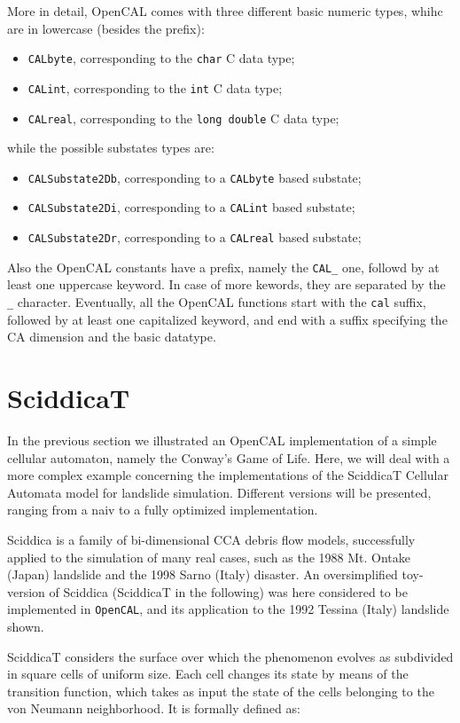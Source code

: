 More in detail, OpenCAL comes with three different basic numeric
types, whihc are in lowercase (besides the prefix):
\begin{itemize}
\item \verb'CALbyte', corresponding to the \verb'char' C data type;
\item \verb'CALint', corresponding to the \verb'int' C data type;
\item \verb'CALreal', corresponding to the \verb'long double' C data type;
\end{itemize}
while the possible substates types are:
\begin{itemize}
\item \verb'CALSubstate2Db', corresponding to a \verb'CALbyte' based substate;
\item \verb'CALSubstate2Di', corresponding to a \verb'CALint' based substate;
\item \verb'CALSubstate2Dr', corresponding to a \verb'CALreal' based substate;
\end{itemize}
Also the OpenCAL constants have a prefix, namely the \verb'CAL_' one,
followd by at least one uppercase keyword. In case of more kewords, they
are separated by the \verb'_' character. Eventually, all the OpenCAL
functions start with the \verb'cal' suffix, followed by at least one
capitalized keyword, and end with a suffix specifying the CA dimension
and the basic datatype.


\section{SciddicaT}
In the previous section we illustrated an OpenCAL implementation of a
simple cellular automaton, namely the Conway’s Game of Life. Here, we
will deal with a more complex example concerning the implementations
of the SciddicaT Cellular Automata model for landslide
simulation. Different versions will be presented, ranging from a naiv
to a fully optimized implementation.

Sciddica is a family of bi-dimensional CCA debris flow models,
successfully applied to the simulation of many real cases, such as the
1988 Mt. Ontake (Japan) landslide and the 1998 Sarno (Italy)
disaster. An oversimplified toy-version of Sciddica (SciddicaT in the
following) was here considered to be implemented in \verb"OpenCAL",
and its application to the 1992 Tessina (Italy) landslide shown.

SciddicaT considers the surface over which the phenomenon evolves as
subdivided in square cells of uniform size. Each cell changes its
state by means of the transition function, which takes as input the
state of the cells belonging to the von Neumann neighborhood. It is
formally defined as:

